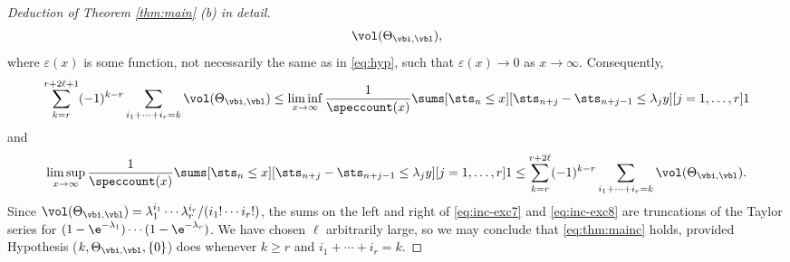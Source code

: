 \documentclass[12pt, reqno, twoside, letterpaper]{amsart}
\begin{document}
\begin{nixnix}
\begin{proof}[Deduction of Theorem \ref{thm:main} (b) in detail]
\begin{align*}
             \vol(\Theta_{\vbi,\vbl}), 
\end{align*}
where $\varepsilon(x)$ is some function, not necessarily the same 
as in \eqref{eq:hyp}, such that $\varepsilon(x) \to 0$ as 
$x \to \infty$. 
%
Consequently, 
\begin{equation}
  \label{eq:inc-exc7}
   \sum_{k = r}^{r + 2\ell + 1}
     (-1)^{k - r}
      \sum_{i_1 + \cdots + i_r = k}
       \vol(\Theta_{\vbi,\vbl})
        \le 
         \liminf_{x \to \infty}
          \frac{1}{\speccount(x)}
           \sums[\sts_n \le x]
                [\sts_{n + j} - \sts_{n + j - 1} \le \lambda_j y]
                [j = 1,\ldots,r] 1
\end{equation}
and 
\begin{equation}
 \label{eq:inc-exc8}
          \limsup_{x \to \infty}
           \frac{1}{\speccount(x)}
            \sums[\sts_n \le x]
                 [\sts_{n + j} - \sts_{n + j - 1} \le \lambda_j y]
                 [j = 1,\ldots,r] 1
           \le 
            \sum_{k = r}^{r + 2\ell}
            (-1)^{k - r}
             \sum_{i_1 + \cdots + i_r = k}
              \vol(\Theta_{\vbi,\vbl}).            
\end{equation}
Since 
$
 \vol(\Theta_{\vbi,\vbl}) 
  = \lambda_1^{i_1}\cdots \lambda_r^{i_r}/(i_1!\cdots i_r!)
$, 
the sums on the left and right of \eqref{eq:inc-exc7} and 
\eqref{eq:inc-exc8} are truncations of the Taylor 
series for $(1 - \e^{-\lambda_1})\cdots (1 - \e^{-\lambda_r})$.
%
We have chosen $\ell$ arbitrarily large, so we may conclude that 
\eqref{eq:thm:mainc} holds, provided 
Hypothesis ($k,\Theta_{\vbi,\vbl},\{0\}$) does whenever 
$k \ge r$ and $i_1 + \cdots + i_r = k$.


\end{proof}
\end{nixnix}
\end{document}
